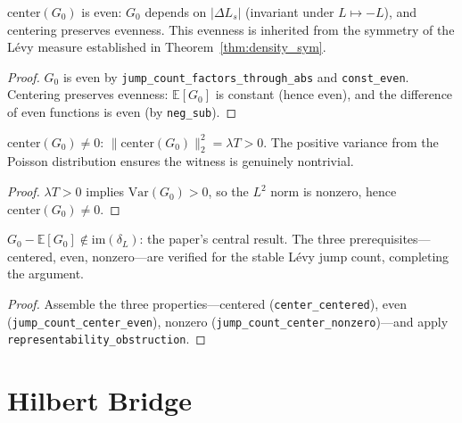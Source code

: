 \begin{theorem}\label{thm:witness_even}
\leanok
{}
$\mathrm{center}(G_0)$ is even: $G_0$ depends on $|\Delta L_s|$ (invariant under $L \mapsto -L$),
and centering preserves evenness.
This evenness is inherited from the symmetry of the Lévy measure established in Theorem~\ref{thm:density_sym}.
\end{theorem}
\begin{proof}\leanok $G_0$ is even by \texttt{jump\_count\_factors\_through\_abs} and \texttt{const\_even}. Centering preserves evenness: $\mathbb{E}[G_0]$ is constant (hence even), and the difference of even functions is even (by \texttt{neg\_sub}).\end{proof}

\begin{theorem}\label{thm:witness_nonzero}
\leanok
{}
$\mathrm{center}(G_0) \neq 0$: $\|\mathrm{center}(G_0)\|_2^2 = \lambda T > 0$.
The positive variance from the Poisson distribution ensures the witness is genuinely nontrivial.
\end{theorem}
\begin{proof}\leanok $\lambda T > 0$ implies $\mathrm{Var}(G_0) > 0$, so the $L^2$ norm is nonzero, hence $\mathrm{center}(G_0) \neq 0$.\end{proof}

\begin{theorem}\label{thm:stable_obstruction}
\leanok
{}
$G_0 - \mathbb{E}[G_0] \notin \mathrm{im}(\delta_L)$: the paper's central result.
The three prerequisites---centered, even, nonzero---are verified for the stable Lévy jump count, completing the argument.
\end{theorem}
\begin{proof}\leanok Assemble the three properties---centered (\texttt{center\_centered}), even (\texttt{jump\_count\_center\_even}), nonzero (\texttt{jump\_count\_center\_nonzero})---and apply \texttt{representability\_obstruction}.\end{proof}

\section{Hilbert Bridge}

